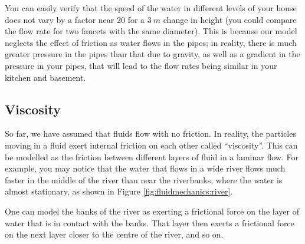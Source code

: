 {{\begin{example}
You can easily verify that the speed of the water in different levels of your house does not vary by a factor near 20 for a $\SI{3}{m}$ change in height (you could compare the flow rate for two faucets with the same diameter). This is because our model neglects the effect of friction as water flows in the pipes; in reality, there is much greater pressure in the pipes than that due to gravity, as well as a gradient in the pressure in your pipes, that will lead to the flow rates being similar in your kitchen and basement.
\end{example}

\subsection{Viscosity}
So far, we have assumed that fluids flow with no friction. In reality, the particles moving in  a fluid exert internal friction on each other called ``viscosity''. This can be modelled as the friction between different layers of fluid in a laminar flow. For example, you may notice that the water that flows in a wide river flows much faster in the middle of the river than near the riverbanks, where the water is almost stationary, as shown in Figure \ref{fig:fluidmechanics:river}. 

One can model the banks of the river as exerting a frictional force on the layer of water that is in contact with the banks. That layer then exerts a frictional force on the next layer closer to the centre of the river, and so on. 

}}
